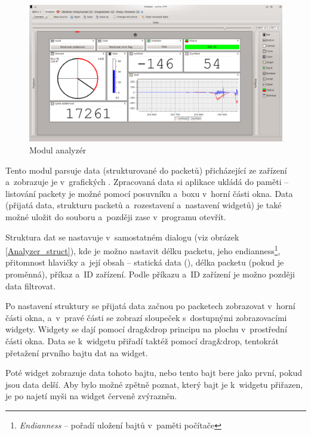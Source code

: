 \documentclass[12pt, a4paper, oneside]{article}
\newcommand{\It}{\textit}  %
\begin{document}
\begin{figure}[h]
\begin{center}
\includegraphics[width=\textwidth]{img/analyzer_all.png}
\caption{Modul analyzér}
\label{Analyzer}
\end{center}
\end{figure}

Tento modul parsuje data (strukturované do packetů) přicházející ze zařízení a~zobrazuje je v~grafických . Zpracovaná data si aplikace ukládá do paměti -- listování packety je možné pomocí posuvníku a~boxu v~horní části okna. Data (přijatá data, strukturu packetů a~rozestavení a~nastavení widgetů) je také možné uložit do souboru a~později zase v~programu otevřít.

Struktura dat se nastavuje v~samostatném dialogu (viz obrázek \ref{Analyzer_struct}), kde je možno nastavit délku packetu, jeho endianness\footnote{\It{Endianness} -- pořadí uložení bajtů v~paměti počítače}, přitomnost hlavičky a~její obsah -- statická data (), délka packetu (pokud je proměnná), příkaz a~ID zařízení. Podle příkazu a~ID zařízení je možno později data filtrovat.

\newpage
\setlength{\voffset}{0mm} %
\pagestyle{plain}

Po nastavení struktury se přijatá data začnou po packetech zobrazovat v~horní části okna, a~v~pravé části se zobrazí sloupeček s~dostupnými zobrazovacími widgety. Widgety se dají pomocí drag\&drop principu  na plochu v~prostřední části okna. Data se k~widgetu přiřadí taktéž pomocí drag\&drop, tentokrát přetažení prvního bajtu dat na widget. 

Poté widget zobrazuje data tohoto bajtu, nebo tento bajt bere jako první, pokud jsou data delší. Aby bylo možné zpětně poznat, který bajt je k~widgetu přiřazen, je po najetí myši na widget červeně zvýrazněn.
\end{document}
